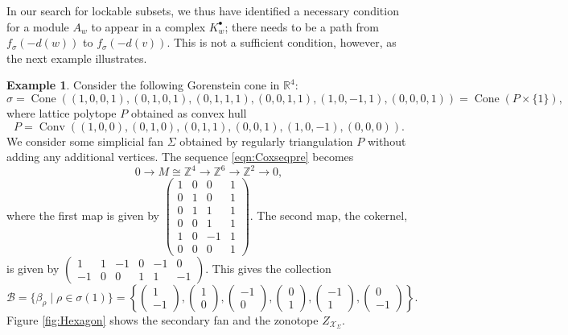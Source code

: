 \documentclass[reqno, 12pt]{amsart}
\theoremstyle{definition}
\newtheorem{example}[theorem]{Example}
\numberwithin{equation}{section}
\newcommand{\Z}{\mathbb{Z}}
\newcommand{\R}{\mathbb{R}}
\newcommand{\cone}{\operatorname{Cone}}
\newcommand{\conv}{\operatorname{Conv}}
\begin{document}
In our search for lockable subsets, we thus have identified a necessary condition for a module $A_w$ to appear in a complex $K_w^\bullet$;  there needs to be a path from $f_\sigma(-d(w))$ to $f_\sigma(-d(v))$. This is not a sufficient condition, however, as the next example illustrates.
\begin{example}
    \label{Exa:Hexagon}
    Consider the following Gorenstein cone in $\R^4$:
    \[
    \sigma=\cone((1,0,0,1),(0,1,0,1),(0,1,1,1),(0,0,1,1),(1,0,-1,1),(0,0,0,1))=\cone(P\times\{1\}),
    \]
    where lattice polytope $P$ obtained as convex hull \[
    P=\conv((1,0,0),(0,1,0),(0,1,1),(0,0,1),(1,0,-1),(0,0,0)).
    \]
    We consider some simplicial fan $\Sigma$ obtained by regularly triangulation $P$ without adding any additional vertices. The sequence \eqref{eqn:Coxseqpre} becomes\[
    0\rightarrow M\cong \Z^4\rightarrow \Z^6\rightarrow \Z^2\rightarrow 0,
    \] 
    where the first map is given by $\begin{pmatrix}
         1&0&0&1\\
         0&1&0&1\\
         0&1&1&1\\
         0&0&1&1\\
         1&0&-1&1\\
         0&0&0&1
    \end{pmatrix}.$
    The second map, the cokernel, is given by $\begin{pmatrix}
        1&1&-1&0&-1&0\\
        -1&0&0&1&1&-1
    \end{pmatrix}.$
    This gives the collection \[
    \mathcal{B}=\{\beta_\rho\mid \rho\in \sigma(1)\}=\left\{\begin{pmatrix}1\\ -1\end{pmatrix}, \begin{pmatrix}1\\ 0\end{pmatrix}, \begin{pmatrix}-1\\ 0\end{pmatrix}, \begin{pmatrix}0\\ 1\end{pmatrix}, \begin{pmatrix}-1\\ 1\end{pmatrix}, \begin{pmatrix}0\\ -1\end{pmatrix}\right\}.
    \]
    Figure \ref{fig:Hexagon} shows the secondary fan and the zonotope $Z_{\mathcal{X}_\Sigma}$.



\end{example}
\end{document}

